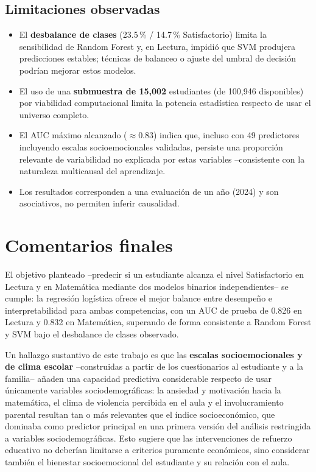 \documentclass[11pt]{article}
\begin{document}
\subsection{Limitaciones observadas}

\begin{itemize}
    \item El \textbf{desbalance de clases} (23.5\,\% / 14.7\,\% Satisfactorio)
    limita la sensibilidad de Random Forest y, en Lectura, impidió que
    SVM produjera predicciones estables; técnicas de balanceo o ajuste
    del umbral de decisión podrían mejorar estos modelos.
    \item El uso de una \textbf{submuestra de 15{,}002} estudiantes (de
    100{,}946 disponibles) por viabilidad computacional limita la
    potencia estadística respecto de usar el universo completo.
    \item El AUC máximo alcanzado ($\approx$0.83) indica que, incluso
    con 49 predictores incluyendo escalas socioemocionales validadas,
    persiste una proporción relevante de variabilidad no explicada por
    estas variables --consistente con la naturaleza multicausal del
    aprendizaje.
    \item Los resultados corresponden a una evaluación de un año (2024)
    y son asociativos, no permiten inferir causalidad.
\end{itemize}

\newpage

\section{Comentarios finales}

El objetivo planteado --predecir si un estudiante alcanza el nivel
Satisfactorio en Lectura y en Matemática mediante dos modelos binarios
independientes-- se cumple: la regresión logística ofrece el mejor
balance entre desempeño e interpretabilidad para ambas competencias, con
un AUC de prueba de 0.826 en Lectura y 0.832 en Matemática, superando de
forma consistente a Random Forest y SVM bajo el desbalance de clases
observado.

Un hallazgo sustantivo de este trabajo es que las \textbf{escalas
socioemocionales y de clima escolar} --construidas a partir de los
cuestionarios al estudiante y a la familia-- añaden una capacidad
predictiva considerable respecto de usar únicamente variables
sociodemográficas: la ansiedad y motivación hacia la matemática, el
clima de violencia percibida en el aula y el involucramiento parental
resultan tan o más relevantes que el índice socioeconómico, que
dominaba como predictor principal en una primera versión del análisis
restringida a variables sociodemográficas. Esto sugiere que las
intervenciones de refuerzo educativo no deberían limitarse a criterios
puramente económicos, sino considerar también el bienestar
socioemocional del estudiante y su relación con el aula.
\end{document}
